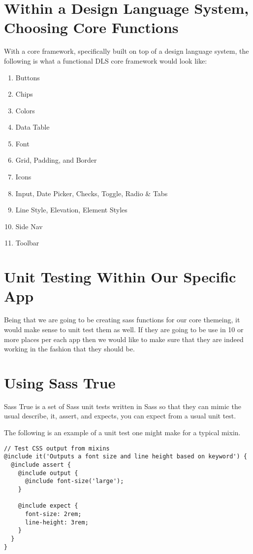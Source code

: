\section{ Within a Design Language System, Choosing Core Functions }
With a core framework, specifically built on top of a design language system, the following is what a functional DLS core framework would look like:
\begin{enumerate}
  \item Buttons
  \item Chips
  \item Colors
  \item Data Table
  \item Font
  \item Grid, Padding, and Border
  \item Icons
  \item Input, Date Picker, Checks, Toggle, Radio \& Tabs
  \item Line Style, Elevation, Element Styles
  \item Side Nav
  \item Toolbar
\end{enumerate}

\section{ Unit Testing Within Our Specific App }
Being that we are going to be creating sass functions for our core themeing, it would make sense to unit test them as well. If they are going to be use in 10 or more places per each app then we would like to make sure that they are indeed working in the fashion that they should be.

\section{ Using Sass True }
Sass True is a set of Sass unit tests written in Sass so that they can mimic the usual describe, it, assert, and expects, you can expect from a usual unit test. 

The following is an example of a unit test one might make for a typical mixin.

\begin{lstlisting}
// Test CSS output from mixins
@include it('Outputs a font size and line height based on keyword') {
  @include assert {
    @include output {
      @include font-size('large');
    }

    @include expect {
      font-size: 2rem;
      line-height: 3rem;
    }
  }
}
\end{lstlisting}


